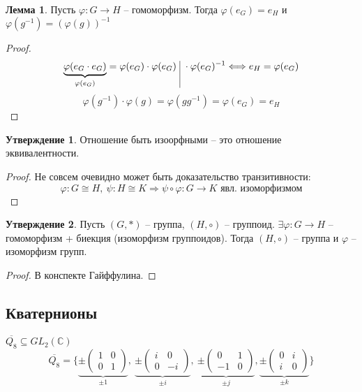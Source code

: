 \documentclass[a4paper, 12pt]{article}
\theoremstyle{definition}
\newtheorem*{lemma}{Лемма}
\newtheorem*{subtheorem}{Утверждение}
\begin{document}
    \begin{lemma}
        Пусть $\varphi: G \longrightarrow H$ -- гомоморфизм. Тогда $\varphi(e_G) = e_H$  и $\varphi(g^{-1}) = (\varphi(g))^{-1}$   
    \end{lemma}
     \begin{proof}
        $$\underbrace{\varphi(e_G\cdot e_G)}_{\varphi(e_G)} = \varphi(e_G)\cdot \varphi(e_G)\ \vline\ \cdot \varphi(e_G)^{-1} \Longleftrightarrow e_H = \varphi(e_G)$$
        $$\varphi(g^{-1})\cdot \varphi(g) = \varphi(gg^{-1}) = \varphi(e_G) = e_H$$
     \end{proof}
    
    \begin{subtheorem}
        Отношение быть изоорфными -- это отношение эквивалентности.
    \end{subtheorem}
    \begin{proof}
        Не совсем очевидно может быть доказательство транзитивности:
        $$\varphi: G \cong H,\ \psi: H \cong K \Longrightarrow \psi\circ \varphi: G \longrightarrow K \text{ явл. изоморфизмом}$$
    \end{proof}

    \begin{subtheorem}
        Пусть $(G, *)$ -- группа, $(H, \circ)$ -- группоид. $\exists \varphi: G \longrightarrow H$ -- гомоморфизм + биекция (изоморфизм группоидов). Тогда $(H, \circ)$ -- группа и $\varphi$ -- изоморфизм групп.  
    \end{subtheorem}
    \begin{proof}
        В конспекте Гайффулина.
    \end{proof}

    \subsection{Кватернионы}
    $\overline{Q_8} \subseteq GL_2(\mathbb{C})$
    $$\overline{Q_8} = \{\underbrace{\pm \begin{pmatrix}
        1 & 0\\0 & 1
    \end{pmatrix}}_{\pm 1},\ \underbrace{\pm \begin{pmatrix}
        i & 0\\0 & -i
    \end{pmatrix}}_{\pm i},\ \underbrace{\pm \begin{pmatrix}
        0 & 1\\-1 & 0
    \end{pmatrix}}_{\pm j},\underbrace{\pm \begin{pmatrix}
        0 & i\\i & 0
    \end{pmatrix}}_{\pm k}\}$$
\end{document}
